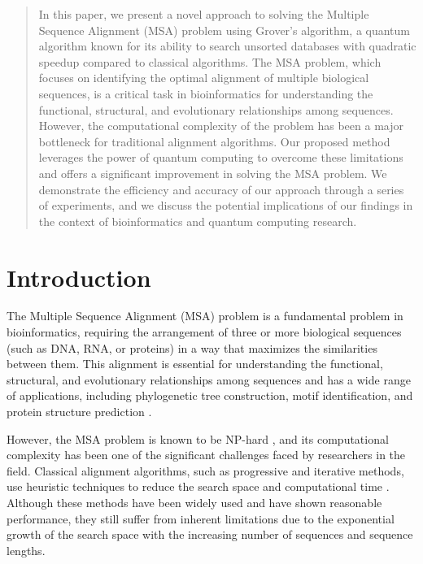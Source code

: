 \begin{abstract}
In this paper, we present a novel approach to solving the Multiple Sequence Alignment (MSA) problem using Grover's algorithm, a quantum algorithm known for its ability to search unsorted databases with quadratic speedup compared to classical algorithms. The MSA problem, which focuses on identifying the optimal alignment of multiple biological sequences, is a critical task in bioinformatics for understanding the functional, structural, and evolutionary relationships among sequences. However, the computational complexity of the problem has been a major bottleneck for traditional alignment algorithms. Our proposed method leverages the power of quantum computing to overcome these limitations and offers a significant improvement in solving the MSA problem. We demonstrate the efficiency and accuracy of our approach through a series of experiments, and we discuss the potential implications of our findings in the context of bioinformatics and quantum computing research.

\end{abstract}

\section{Introduction}

The Multiple Sequence Alignment (MSA) problem is a fundamental problem in bioinformatics, requiring the arrangement of three or more biological sequences (such as DNA, RNA, or proteins) in a way that maximizes the similarities between them. This alignment is essential for understanding the functional, structural, and evolutionary relationships among sequences and has a wide range of applications, including phylogenetic tree construction, motif identification, and protein structure prediction \cite{thompson1994clustal}.

However, the MSA problem is known to be NP-hard \cite{wang1994computational}, and its computational complexity has been one of the significant challenges faced by researchers in the field. Classical alignment algorithms, such as progressive and iterative methods, use heuristic techniques to reduce the search space and computational time \cite{edgar2004muscle, notredame2000tcoffee}. Although these methods have been widely used and have shown reasonable performance, they still suffer from inherent limitations due to the exponential growth of the search space with the increasing number of sequences and sequence lengths.

